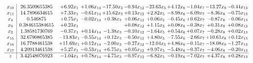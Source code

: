 \documentclass[9pt]{article}
\begin{document}
\[\begin{array}{c| c c@{\hskip 2pt} c@{\hskip 2pt} c@{\hskip 2pt} c@{\hskip 2pt} c@{\hskip 2pt} c@{\hskip 2pt} c@{\hskip 2pt} c@{\hskip 2pt} c@{\hskip 2pt} }
 x_{10}   &  26.3509615385 & +  6.92 x_{1} & +  1.06 x_{14} & -17.50 x_{3} & -0.94 x_{12} & -23.63 x_{5} & +  4.12 x_{6} & -1.04 x_{7} & -13.27 x_{8} & -0.44 x_{13}\\
 x_{11}   &  14.7896634615 & +  7.33 x_{1} & -0.61 x_{14} & + 15.62 x_{3} & +  0.13 x_{12} & +  2.82 x_{5} & -8.98 x_{6} & -6.09 x_{7} & -8.36 x_{8} & -0.75 x_{13}\\
 x_{4}   &  0.546875 & +  0.75 x_{1} & -0.02 x_{14} & +  0.38 x_{3} & +  0.06 x_{12} & +  0.06 x_{5} & -0.45 x_{6} & +  0.62 x_{7} & -0.87 x_{8} & -0.06 x_{13}\\
 x_{9}   &  0.384615384615 & +  0.23 x_{1} &    &   & +  0.08 x_{12} & +  1.15 x_{5} & +  0.08 x_{6} & -0.38 x_{7} & +  0.31 x_{8} & +  0.08 x_{13}\\
 x_{2}   &  1.38581730769 & -0.37 x_{1} & +  0.14 x_{14} & -1.38 x_{3} & -0.10 x_{12} & -1.64 x_{5} & +  0.54 x_{6} & +  0.07 x_{7} & -0.28 x_{8} & +  0.02 x_{13}\\
 x_{15}   &  32.6790865385 & -13.83 x_{1} & -0.55 x_{14} & +  0.12 x_{3} & -0.50 x_{12} & +  4.80 x_{5} & -7.55 x_{6} & -2.66 x_{7} & + 10.61 x_{8} & +  0.12 x_{13}\\
 x_{16}   &  16.7788461538 & + 11.69 x_{1} & +  0.12 x_{14} & -2.00 x_{3} & -0.27 x_{12} & -12.04 x_{5} & +  4.86 x_{6} & -0.15 x_{7} & -18.08 x_{8} & -1.27 x_{13}\\
 x_{17}   &  4.20913461538 & +  5.27 x_{1} & -0.53 x_{14} & +  6.75 x_{3} & +  0.05 x_{12} & +  9.97 x_{5} & -5.48 x_{6} & -0.37 x_{7} & -4.06 x_{8} & -0.20 x_{13}\\
\hline
z    &  3.42548076923 & -1.04 x_{1} & +  0.78 x_{14} & -4.75 x_{3} & -0.97 x_{12} & -6.82 x_{5} & -0.19 x_{6} & -7.02 x_{7} & +  4.37 x_{8} & +  0.28 x_{13}\\
\end{array}\]
\end{document}
